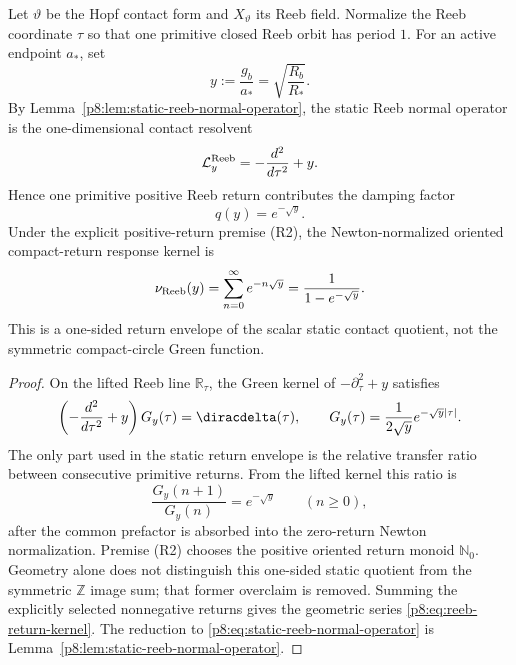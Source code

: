 \documentclass[12pt,a4paper]{article}
\begin{document}
\begin{lemma}
\label{p8:lem:reeb-single-return-damping}
Let \(\vartheta\) be the Hopf contact form and \(X_\vartheta\) its Reeb field.  Normalize the Reeb coordinate \(\tau\) so that one primitive closed Reeb orbit has period \(1\).  For an active endpoint \(a_*\), set
\begin{equation}
\label{p8:eq:y-active-endpoint}
    y:=\frac{g_b}{a_*}
    =\sqrt{\frac{R_b}{R_*}}.
\end{equation}
By Lemma~\ref{p8:lem:static-reeb-normal-operator}, the static Reeb normal operator is the one-dimensional contact resolvent
\begin{equation}
\label{p8:eq:static-reeb-normal-operator}
    \mathcal L_y^{\rm Reeb}=-\frac{d^2}{d\tau^2}+y.
\end{equation}
Hence one primitive positive Reeb return contributes the damping factor
\begin{equation}
\label{p8:eq:reeb-return-damping-q}
    q(y)=e^{-\sqrt y}.
\end{equation}
Under the explicit positive-return premise (R2), the Newton-normalized oriented compact-return response kernel is
\begin{equation}
\label{p8:eq:reeb-return-kernel}
    \nu_{\rm Reeb}(y)=\sum_{n=0}^{\infty}e^{-n\sqrt y}
    =\frac{1}{1-e^{-\sqrt y}}.
\end{equation}
This is a one-sided return envelope of the scalar static contact quotient, not the symmetric compact-circle Green function.
\end{lemma}

\begin{proof}
On the lifted Reeb line \(\mathbb R_\tau\), the Green kernel of \(-\partial_\tau^2+y\) satisfies
\begin{equation}
    \left(-\frac{d^2}{d\tau^2}+y\right)G_y(\tau)=\diracdelta(\tau),
    \qquad
    G_y(\tau)=\frac{1}{2\sqrt y}e^{-\sqrt y|\tau|}.
\end{equation}
The only part used in the static return envelope is the relative transfer ratio between consecutive primitive returns.  From the lifted kernel this ratio is
\[
    \frac{G_y(n+1)}{G_y(n)}=e^{-\sqrt y}
    \qquad (n\ge0),
\]
after the common prefactor is absorbed into the zero-return Newton normalization.  Premise (R2) chooses the positive oriented return monoid $\mathbb N_0$.  Geometry alone does not distinguish this one-sided static quotient from the symmetric $\mathbb Z$ image sum; that former overclaim is removed.  Summing the explicitly selected nonnegative returns gives the geometric series \eqref{p8:eq:reeb-return-kernel}.  The reduction to \eqref{p8:eq:static-reeb-normal-operator} is Lemma~\ref{p8:lem:static-reeb-normal-operator}.
\end{proof}
\end{document}
